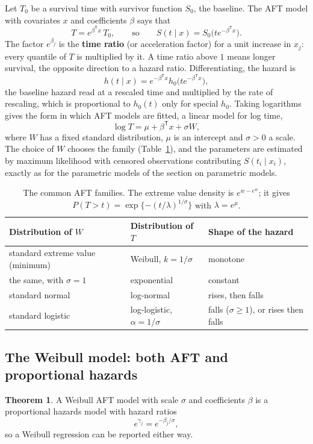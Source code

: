\documentclass[11pt,a4paper]{article}
\numberwithin{equation}{section}
\theoremstyle{definition}
\newtheorem{thm}{Theorem}[subsection]
\begin{document}
Let $T_0$ be a survival time with survivor function $S_0$, the baseline. The AFT model with covariates $x$ and coefficients $\beta$ says that
\[
T = e^{\beta^{\mathsf T}x}\,T_0 , \qquad\text{so}\qquad S(t \mid x) = S_0\big(te^{-\beta^{\mathsf T}x}\big) .
\]
The factor $e^{\beta_j}$ is the \textbf{time ratio} (or acceleration factor) for a unit increase in $x_j$: every quantile of $T$ is multiplied by it. A time ratio above $1$ means longer survival, the opposite direction to a hazard ratio. Differentiating, the hazard is
\[
h(t \mid x) = e^{-\beta^{\mathsf T}x}h_0\big(te^{-\beta^{\mathsf T}x}\big) ,
\]
the baseline hazard read at a rescaled time and multiplied by the rate of rescaling, which is proportional to $h_0(t)$ only for special $h_0$. Taking logarithms gives the form in which AFT models are fitted, a linear model for log time,
\[
\log T = \mu + \beta^{\mathsf T}x + \sigma W ,
\]
where $W$ has a fixed standard distribution, $\mu$ is an intercept and $\sigma > 0$ a scale. The choice of $W$ chooses the family (Table~\ref{tab:aft}), and the parameters are estimated by maximum likelihood with censored observations contributing $S(t_i \mid x_i)$, exactly as for the parametric models of the section on parametric models.

\begin{table}[H]
\centering
\begin{tabular}{lll}
\hline
Distribution of $W$ & Distribution of $T$ & Shape of the hazard \\
\hline
standard extreme value (minimum) & Weibull, $k = 1/\sigma$ & monotone \\
the same, with $\sigma = 1$ & exponential & constant \\
standard normal & log-normal & rises, then falls \\
standard logistic & log-logistic, $\alpha = 1/\sigma$ & falls ($\sigma \ge 1$), or rises then falls \\
\hline
\end{tabular}
\caption{The common AFT families. The extreme value density is $e^{w - e^w}$; it gives $P(T > t) = \exp\{-(t/\lambda)^{1/\sigma}\}$ with $\lambda = e^{\mu}$.}
\label{tab:aft}
\end{table}

\subsection{The Weibull model: both AFT and proportional hazards}
\label{ssec:aftweibull}

\begin{thm}
\label{thm:weibullaft}
A Weibull AFT model with scale $\sigma$ and coefficients $\beta$ is a proportional hazards model with hazard ratios
\[
e^{\gamma_j} = e^{-\beta_j/\sigma} ,
\]
so a Weibull regression can be reported either way.
\end{thm}
\end{document}
